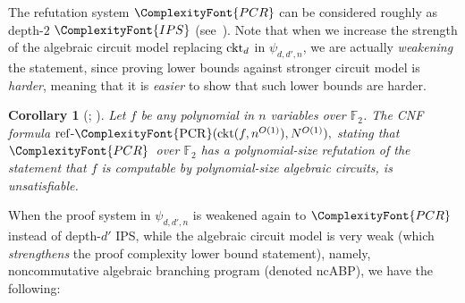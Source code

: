 \documentclass[11pt,letter]{article}
\newtheorem{corollary}[theorem]{Corollary}
\theoremstyle{remark} %
\newcommand{\RankP}{\mathrm{RankP}} %
\newcommand{\IPS}{%
    {
        \ComplexityFont{IPS} 
    }
}
\newcommand{\PCR}{ %
    {
        \ComplexityFont{PCR}
    }
}
\newcommand{\F}{\mathbb{F}}
\begin{document}
{%








The refutation system $\PCR$ can be considered roughly as depth-$2$ $\IPS$ (see~\cite{GP18}).
Note that when we increase the strength of the algebraic circuit model replacing ${\rm ckt}_d$ in $\psi_{d,d',n}$, we are actually \emph{weakening} the statement, since proving lower bounds against stronger circuit model is \emph{harder}, meaning that it is \emph{easier} to show that such lower bounds are harder. 

\begin{corollary}[\cite{GGLST25}; ]
    \label{cor: 1.3}
        Let $f$ be any polynomial in $n$ variables over $\F_2$.
        The CNF formula      
        $%
        {\rm ref\text{-}\PCR}%
        ({\rm ckt}(%
                        f, n^{O(1)}
                    )%
        , N^{O(1)}%
        ),%
        $ stating that $\PCR$\ over $\F_2$ has a polynomial-size refutation of the statement that $f$ is computable by polynomial-size algebraic circuits, is unsatisfiable. 
\end{corollary}
\smallskip

When the proof system in $\psi_{d,d',n}$ is weakened again to $\PCR$ instead of depth-$d'$ IPS, while the algebraic circuit model is very weak (which \emph{strengthens} the proof complexity lower bound statement), namely, noncommutative algebraic branching program (denoted ncABP), we have the following: 

}
\end{document}
